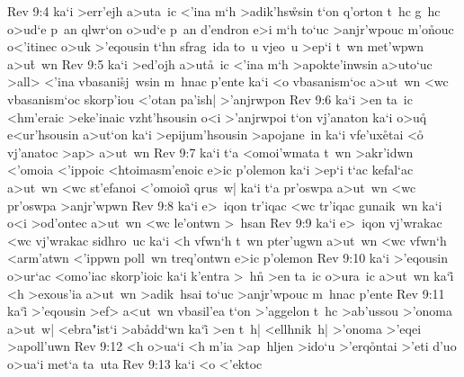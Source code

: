 \vs Rev 9:4
ka`i
>err'ejh
a>uta~ic
<'ina
m`h
>adik'hs\r{w}sin
t`on
q'orton
t~hc
g~hc
o>ud`e
p~an
qlwr`on
o>ud`e
p~an
d'endron
e>i
m`h
to`uc
>anjr'wpouc
m'o\r{n}ouc
o<'itinec
o>uk
>'eqousin
t`hn
sfrag~ida
to~u
vjeo~u
>ep`i
t~wn
met'wpwn
a>u\r{t}~wn\bibvsend
{}
\vs Rev 9:5
ka`i
>ed'ojh
a>ut\r{a}~ic
<'ina
m`h
>apokte'inwsin
a>uto`uc
>all>
<'ina
vbasani\r{s}j~wsin
m~hnac
p'ente
ka`i
<o
vbasanism`oc
a>ut~wn
<wc
vbasanism`oc
skorp'iou
<'otan
pa'ish|
>'anjrwpon\bibvsend
\vs Rev 9:6
ka`i
>en
ta~ic
<hm'eraic
>eke'inaic
vzht'hsousin
o<i
>'anjrwpoi
t`on
vj'anaton
ka`i
o>u\r{q}
e<ur'hsousin
a>ut`on
ka`i
>epijum'hsousin
>apojane~in
ka`i
vfe'ux\r{e}tai
<o\r{}
vj'anatoc
>ap>
a>ut~wn\bibvsend
\vs Rev 9:7
ka`i
t`a
<omoi'wmata
t~wn
>akr'idwn
<'omoia
<'ippoic
<htoimasm'enoic
e>ic
p'olemon
ka`i
>ep`i
t`ac
kefal`ac
a>ut~wn
<wc
st'efanoi
<'omoioi\r{}
qrus~w|
ka`i
t`a
pr'oswpa
a>ut~wn
<wc
pr'oswpa
>anjr'wpwn\bibvsend
\vs Rev 9:8
ka`i
e>~iqon
tr'iqac
<wc
tr'iqac
gunaik~wn
ka`i
o<i
>od'ontec
a>ut~wn
<wc
le'ontwn
>~hsan\bibvsend
\vs Rev 9:9
ka`i
e>~iqon
vj'wrakac
<wc
vj'wrakac
sidhro~uc
ka`i
<h
vfwn`h
t~wn
pter'ugwn
a>ut~wn
<wc
vfwn`h
<arm'atwn
<'ippwn
poll~wn
treq'ontwn
e>ic
p'olemon\bibvsend
\vs Rev 9:10
ka`i
>'eqousin
o>ur`ac
<omo'iac
skorp'ioic
ka`i
k'entra
>~h\r{n}
>en
ta~ic
o>ura~ic
a>ut~wn
ka`i\r{}
<h
>exous'ia
a>ut~wn
>adik~hsai
to`uc
>anjr'wpouc
m~hnac
p'ente\bibvsend
\vs Rev 9:11
ka`i\r{}
>'eqousin
>ef>
a<ut~wn
vbasil'ea
t`on
>'aggelon
t~hc
>ab'ussou
>'onoma
a>ut~w|
<ebra"ist`i
>ab\r{a}dd`wn
ka`i\r{}
>en
t~h|
<ellhnik~h|
>'onoma
>'eqei
>apoll'uwn\bibvsend
\vs Rev 9:12
<h
o>ua`i
<h
m'ia
>ap~hljen
>ido`u
>'erq\r{o}ntai
>'eti
d'uo
o>ua`i
met`a
ta~uta\bibvsend
\vs Rev 9:13
ka`i
<o
<'ektoc

